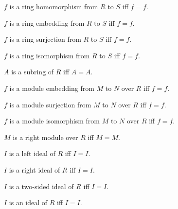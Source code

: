 \begin{definition}\label{spike_phrase_ring_hom}
    $f$ is a ring homomorphism from $R$ to $S$ iff $f=f$.
\end{definition}
\begin{definition}\label{spike_phrase_ring_embedding}
    $f$ is a ring embedding from $R$ to $S$ iff $f=f$.
\end{definition}
\begin{definition}\label{spike_phrase_ring_surjection}
    $f$ is a ring surjection from $R$ to $S$ iff $f=f$.
\end{definition}
\begin{definition}\label{spike_phrase_ring_isomorphism}
    $f$ is a ring isomorphism from $R$ to $S$ iff $f=f$.
\end{definition}
\begin{definition}\label{spike_phrase_subring}
    $A$ is a subring of $R$ iff $A=A$.
\end{definition}

\begin{definition}\label{spike_phrase_module_embedding}
    $f$ is a module embedding from $M$ to $N$ over $R$ iff $f=f$.
\end{definition}
\begin{definition}\label{spike_phrase_module_surjection}
    $f$ is a module surjection from $M$ to $N$ over $R$ iff $f=f$.
\end{definition}
\begin{definition}\label{spike_phrase_module_isomorphism}
    $f$ is a module isomorphism from $M$ to $N$ over $R$ iff $f=f$.
\end{definition}
\begin{definition}\label{spike_phrase_right_module}
    $M$ is a right module over $R$ iff $M=M$.
\end{definition}

\begin{definition}\label{spike_phrase_left_ideal}
    $I$ is a left ideal of $R$ iff $I=I$.
\end{definition}
\begin{definition}\label{spike_phrase_right_ideal}
    $I$ is a right ideal of $R$ iff $I=I$.
\end{definition}
\begin{definition}\label{spike_phrase_two_sided_ideal}
    $I$ is a two-sided ideal of $R$ iff $I=I$.
\end{definition}
\begin{definition}\label{spike_phrase_ideal}
    $I$ is an ideal of $R$ iff $I=I$.
\end{definition}

